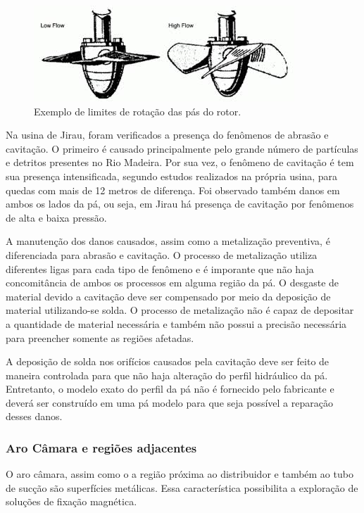 \begin{figure}[h!]	
	\includegraphics[width=\columnwidth]{figs/intro/blades_angle}
	\caption{Exemplo de limites de rotação das pás do rotor.}
	\label{fig::blades_angle}
\end{figure}

Na usina de Jirau, foram verificados a presença do fenômenos de abrasão e cavitação. O primeiro é 
causado principalmente pelo grande número de partículas e detritos presentes no Rio Madeira. Por 
sua vez, o fenômeno de cavitação é tem sua presença intensificada, segundo estudos realizados na 
própria usina, para quedas com mais de 12 metros de diferença. Foi observado também danos em ambos 
os lados da pá, ou seja, em Jirau há presença de cavitação por fenômenos de alta e baixa pressão. 

A manutenção dos danos causados, assim como a metalização preventiva, é diferenciada para abrasão 
e cavitação. O processo de metalização utiliza diferentes ligas para cada tipo de fenômeno e é 
imporante que não haja concomitância de ambos os processos em alguma região da pá. O desgaste de 
material devido a cavitação deve ser compensado por meio da deposição de material utilizando-se solda. 
O processo de metalização não é capaz de depositar a quantidade de material necessária e também não 
possui a precisão necessária para preencher somente as regiões afetadas. 

A deposição de solda nos orifícios causados pela cavitação deve ser feito de maneira controlada 
para que não haja alteração do perfil hidráulico da pá. Entretanto, o modelo exato do perfil da 
pá não é fornecido pelo fabricante e deverá ser construído em uma pá modelo para que seja possível 
a reparação desses danos.


\subsubsection{Aro Câmara e regiões adjacentes}

O aro câmara, assim como o a região próxima ao distribuidor e também ao tubo de
sucção são superfícies metálicas. Essa característica possibilita a exploração de soluções de fixação magnética.

